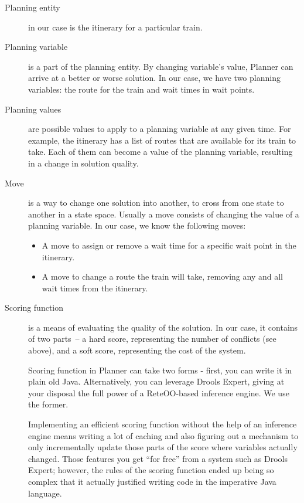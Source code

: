 \documentclass[10pt,a4paper,final]{article}
\begin{document}
\begin{description}
\item[Planning entity] in our case is the itinerary for a particular train.

\item[Planning variable] is a part of the planning entity. By changing variable's value, Planner can arrive at a better or worse solution. In our case, we have two planning variables: the route for the train and wait times in wait points.

\item[Planning values] are possible values to apply to a planning variable at any given time. For example, the itinerary has a list of routes that are available for its train to take. Each of them can become a value of the planning variable, resulting in a change in solution quality.

\item[Move] is a way to change one solution into another, to cross from one state to another in a state space. Usually a move consists of changing the value of a planning variable. In our case, we know the following moves:

\begin{itemize}
\item A move to assign or remove a wait time for a specific wait point in the itinerary.
\item A move to change a route the train will take, removing any and all wait times from the itinerary.
\end{itemize}

\item[Scoring function] is a means of evaluating the quality of the solution. In our case, it contains of two parts~-- a hard score, representing the number of conflicts (see above), and a soft score, representing the cost of the system.

Scoring function in Planner can take two forms - first, you can write it in plain old Java. Alternatively, you can leverage Drools Expert, giving at your disposal the full power of a ReteOO-based inference engine. We use the former.

Implementing an efficient scoring function without the help of an inference engine means writing a lot of caching and also figuring out a mechanism to only incrementally update those parts of the score where variables actually changed. Those features you get ``for free'' from a system such as Drools Expert; however, the rules of the scoring function ended up being so complex that it actually justified writing code in the imperative Java language.

\end{description}
\end{document}
